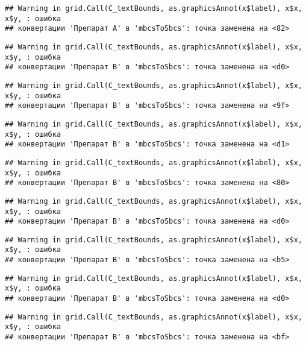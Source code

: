 \documentclass[
]{article}
\begin{document}
\begin{verbatim}
## Warning in grid.Call(C_textBounds, as.graphicsAnnot(x$label), x$x, x$y, : ошибка
## конвертации 'Препарат A' в 'mbcsToSbcs': точка заменена на <82>
\end{verbatim}

\begin{verbatim}
## Warning in grid.Call(C_textBounds, as.graphicsAnnot(x$label), x$x, x$y, : ошибка
## конвертации 'Препарат B' в 'mbcsToSbcs': точка заменена на <d0>
\end{verbatim}

\begin{verbatim}
## Warning in grid.Call(C_textBounds, as.graphicsAnnot(x$label), x$x, x$y, : ошибка
## конвертации 'Препарат B' в 'mbcsToSbcs': точка заменена на <9f>
\end{verbatim}

\begin{verbatim}
## Warning in grid.Call(C_textBounds, as.graphicsAnnot(x$label), x$x, x$y, : ошибка
## конвертации 'Препарат B' в 'mbcsToSbcs': точка заменена на <d1>
\end{verbatim}

\begin{verbatim}
## Warning in grid.Call(C_textBounds, as.graphicsAnnot(x$label), x$x, x$y, : ошибка
## конвертации 'Препарат B' в 'mbcsToSbcs': точка заменена на <80>
\end{verbatim}

\begin{verbatim}
## Warning in grid.Call(C_textBounds, as.graphicsAnnot(x$label), x$x, x$y, : ошибка
## конвертации 'Препарат B' в 'mbcsToSbcs': точка заменена на <d0>
\end{verbatim}

\begin{verbatim}
## Warning in grid.Call(C_textBounds, as.graphicsAnnot(x$label), x$x, x$y, : ошибка
## конвертации 'Препарат B' в 'mbcsToSbcs': точка заменена на <b5>
\end{verbatim}

\begin{verbatim}
## Warning in grid.Call(C_textBounds, as.graphicsAnnot(x$label), x$x, x$y, : ошибка
## конвертации 'Препарат B' в 'mbcsToSbcs': точка заменена на <d0>
\end{verbatim}

\begin{verbatim}
## Warning in grid.Call(C_textBounds, as.graphicsAnnot(x$label), x$x, x$y, : ошибка
## конвертации 'Препарат B' в 'mbcsToSbcs': точка заменена на <bf>
\end{verbatim}
\end{document}
